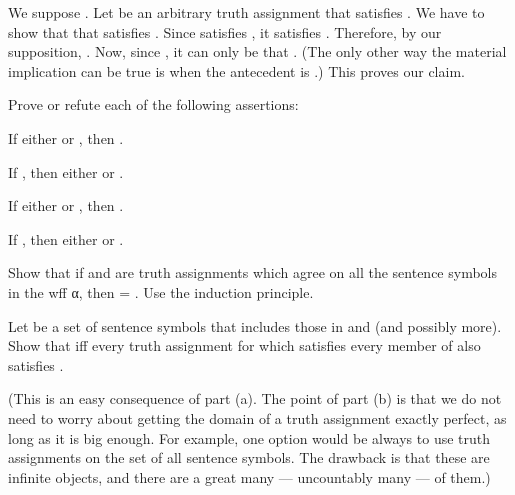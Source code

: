 		We suppose . Let  be an arbitrary truth assignment that satisfies . We have to show that  that satisfies . Since  satisfies , it satisfies . Therefore, by our supposition, . Now, since , it can only be that . (The only other way the material implication can be true is when the antecedent is .) This proves our claim.
	\stopproof

	\startproposition [title={Exercise 1.2.5}]
		Prove or refute each of the following assertions:
		\startitemize[m, joinedup]
			\item  If either  or , then .
			\item  If , then either  or .
		\stopitemize
	\stopproposition
	\startproof
		\startitemize[m]
			\item  If either  or , then .
			\item  If , then either  or .
		\stopitemize
	\stopproof

	\startproposition [title={Exercise 1.2.6}]
		\startitemize[m, joinedup]

			\item  Show that if  and  are truth assignments which agree on all the sentence symbols in the wff α, then  = . Use the induction principle.
			
			\item  Let  be a set of sentence symbols that includes those in  and  (and possibly more). Show that  iff every truth assignment for  which satisfies every member of  also satisfies .

				(This is an easy consequence of part (a). The point of part (b) is that we do not need to worry about getting the domain of a truth assignment exactly perfect, as long as it is big enough. For example, one option would be always to use truth assignments on the set of all sentence symbols. The drawback is that these are infinite objects, and there are a great many — uncountably many — of them.)
		\stopitemize
	\stopproposition
	\startproof
		\startitemize[m]
			\item  

			\item  
		\stopitemize
	\stopproof

\stopexercises

